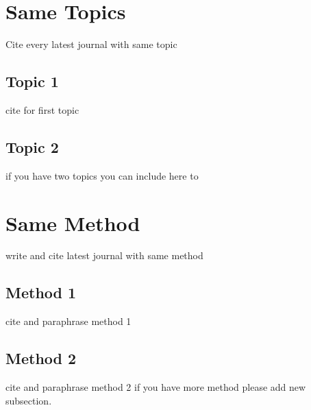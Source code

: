 \section{Same Topics}
Cite every latest journal with same topic
\subsection{Topic 1}
cite for first topic

\subsection{Topic 2}
if you have two topics you can include here to


\section{Same Method}
write and cite latest journal with same method

\subsection{Method 1}
cite and paraphrase method 1

\subsection{Method 2}
cite and paraphrase method 2 if you have more method please add new subsection.

 